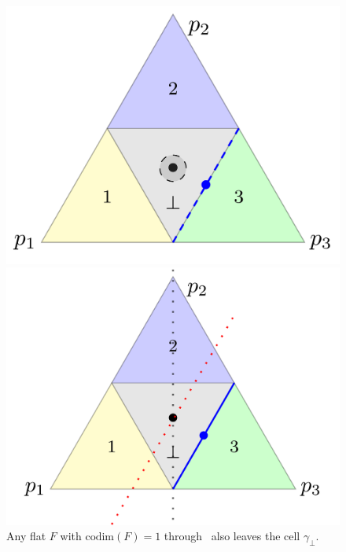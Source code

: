 \documentclass{article}
\newcommand{\codim}{\mathrm{codim}}
\newcommand{\Sc}{\mathcal{S}}  %
\begin{document}
\begin{figure}
\begin{minipage}{0.4\linewidth}
	\centering
	\includegraphics[width=\linewidth]{tikz/fsd-bound.pdf}
	\caption{%
		$\dim(\Sc_{\gamma_\bot}($\textbullet$)) = 2$ and $\dim(\Sc_{\gamma_\bot}(${\color{blue}\textbullet}$)) = 1$}
	\label{fig:fsd-bound}
\end{minipage}
\hfill
\begin{minipage}{0.4\linewidth}
	\centering
	\includegraphics[width=\linewidth]{tikz/flats-bound.pdf}
	\caption{Any flat $F$ with $\codim(F) = 1$ through \textbullet \, also leaves the cell $\gamma_\bot$. %
	}
	\label{fig:flats-bound}
\end{minipage}
\end{figure}
\end{document}
